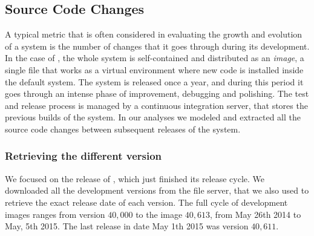 %
%



\subsection{Source Code Changes}\label{sub:changes}

A typical metric that is often considered in evaluating the growth and evolution of a system is the number of changes that it goes through during its development.
In the case of \pha, the whole system is self-contained and distributed as an \emph{image}, a single file that works as a virtual environment where new code is installed inside the default system.
The \pha system is released once a year, and during this period it goes through an intense phase of improvement, debugging and polishing.
The test and release process is managed by a continuous integration server, that stores the previous builds of the system.
In our analyses we modeled and extracted all the source code changes between subsequent releases of the \pha system.


\subsubsection{Retrieving the different version}

We focused on the release of , which just finished its release cycle.
We downloaded all the development versions from the file server, that we also used to retrieve the exact release date of each version.
The full cycle of development images ranges from version $40,000$ to the image $40,613$, from May 26th 2014 to May, 5th 2015.
The last release in date May 1th 2015 was version $40,611$.


